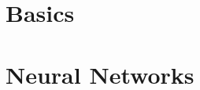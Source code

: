 \documentclass[fontsize=11pt,paper=a5,pagesize=auto]{scrbook}
\begin{document}
\maketitle
\tableofcontents


\part{Basics}




\part{Neural Networks}



% 
\end{document}
